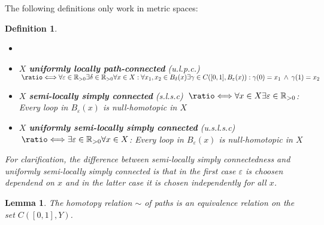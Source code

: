 \documentclass[a4paper, 11pt, twoside]{article}
\newcommand{\R}[0]{\mathbb{R}}
\newcommand*{\longeq}{\ratio\Longleftrightarrow}
\theoremstyle{break}
\theoremstyle{break}
\newtheorem{defin}[thm]{Definition}
\newtheorem{lemma}[thm]{Lemma}
\begin{document}
The following definitions only work in metric spaces:

\begin{defin}
  \begin{itemize}
    \item[] %
    \item $X$ \textbf{uniformly locally path-connected} (u.l.p.c.) $\: \longeq \\ \forall \varepsilon \in \R_{>0} \exists \delta \in \R_{>0}\forall x \in X: \forall x_1, x_2 \in B_{\delta}(x)\exists \gamma \in C([0,1], B_{\varepsilon}(x)): \gamma(0) = x_1 \: \land \: \gamma(1) = x_2$
    \item $X$ \textbf{semi-locally simply connected} (s.l.s.c) $\: \longeq \\ \forall x\in X\exists \varepsilon \in \R_{>0}$: Every loop in $B_{\varepsilon}(x)$ is null-homotopic in $X$
    \item $X$ \textbf{uniformly semi-locally simply connected} (u.s.l.s.c) $\: \longeq \\ \exists \varepsilon \in \R_{>0}\forall x\in X$: Every loop in $B_{\varepsilon}(x)$ is null-homotopic in $X$
  \end{itemize}
  \vspace*{10pt}
  For clarification, the difference between semi-locally simply connectedness and uniformly semi-locally simply connected is 
  that in the first case $\varepsilon$ is choosen dependend on $x$ and in the latter case it is chosen independently for all $x$.
\end{defin}

\begin{lemma} \label{lem:homotopy-equivalence}
  The homotopy relation $\sim$ of paths is an equivalence relation on the set $C([0,1],Y)$.
\end{lemma}
\end{document}
